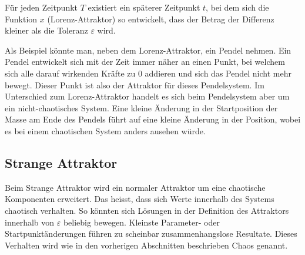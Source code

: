 Für jeden Zeitpunkt $T$ existiert ein späterer Zeitpunkt $t$, bei dem sich die Funktion $x$ (Lorenz-Attraktor) so entwickelt, dass der Betrag der Differenz kleiner als die Toleranz $\varepsilon$ wird. 

Als Beispiel könnte man, neben dem Lorenz-Attraktor, ein Pendel nehmen. Ein Pendel entwickelt sich mit der Zeit immer näher an einen Punkt, bei welchem sich alle darauf wirkenden Kräfte zu 0 addieren und sich das Pendel nicht mehr bewegt. Dieser Punkt ist also der Attraktor für dieses Pendelsystem. Im Unterschied zum Lorenz-Attraktor handelt es sich beim Pendelsystem aber um ein nicht-chaotisches System. Eine kleine Änderung in der Startposition der Masse am Ende des Pendels führt auf eine kleine Änderung in der Position, wobei es bei einem chaotischen System anders ausehen würde. 

\subsection{Strange Attraktor}
Beim Strange Attraktor wird ein normaler Attraktor um eine chaotische Komponenten erweitert. Das heisst, dass sich Werte innerhalb des Systems chaotisch verhalten. So könnten sich Lösungen in der Definition des Attraktors innerhalb von $\varepsilon$ beliebig bewegen. Kleinste Parameter- oder Startpunktänderungen führen zu scheinbar zusammenhangslose Resultate. Dieses Verhalten wird wie in den vorherigen Abschnitten beschrieben Chaos genannt.
